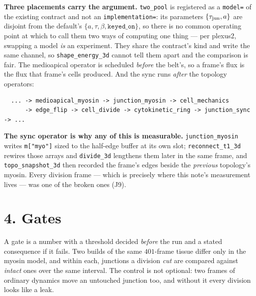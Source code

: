 \documentclass[10pt,a4paper]{article}
\newcommand{\code}[1]{\texttt{#1}}
\newcommand{\op}[1]{\texttt{#1}}
\begin{document}
\textbf{Three placements carry the argument.} \code{two\_pool} is registered as a \code{model=} of the
existing contract and not an \code{implementation=}: its parameters $\{\tau_{\rm jun},a\}$ are disjoint
from the default's $\{a,\tau,\beta,\code{keyed\_on}\}$, so there is no common operating point at which
to call them two ways of computing one thing --- per plexus2, swapping a model \emph{is} an
experiment. They share the contract's kind and write the same channel, so \op{shape\_energy\_3d} cannot
tell them apart and the comparison is fair. The medioapical operator is scheduled \emph{before} the
belt's, so a frame's flux is the flux that frame's cells produced. And the sync runs \emph{after} the
topology operators:

\smallskip
{\footnotesize
\begin{verbatim}
  ... -> medioapical_myosin -> junction_myosin -> cell_mechanics
      -> edge_flip -> cell_divide -> cytokinetic_ring -> junction_sync -> ...
\end{verbatim}}
\smallskip

\textbf{The sync operator is why any of this is measurable.} \op{junction\_myosin} writes
\code{m["myo"]} sized to the half-edge buffer at its own slot; \op{reconnect\_t1\_3d} rewires those
arrays and \op{divide\_3d} lengthens them later in the same frame, and \op{topo\_snapshot\_3d} then
recorded the frame's edges beside the \emph{previous} topology's myosin. Every division frame --- which
is precisely where this note's measurement lives --- was one of the broken ones (J9).

\section*{4.\; Gates}

A gate is a number with a threshold decided \emph{before} the run and a stated consequence if it
fails. Two builds of the same $401$-frame tissue differ only in the myosin model, and within each,
junctions a division \emph{cut} are compared against \emph{intact} ones over the same interval. The
control is not optional: two frames of ordinary dynamics move an untouched junction too, and without it
every division looks like a leak.
\end{document}
